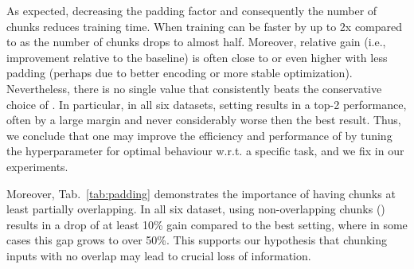 As expected, decreasing the padding factor and consequently the number of chunks reduces training time. When  training can be faster by up to 2x compared to  as the number of chunks drops to almost half. 
Moreover, relative gain (i.e., improvement relative to the baseline) is often close to or even higher with less padding (perhaps due to better encoding or more stable optimization). Nevertheless, there is no single  value that consistently beats the conservative choice of . In particular, in all six datasets, setting  results in a top-2 performance, often by a large margin and never considerably worse then the best result.
Thus, we conclude that one may improve the efficiency and performance of \sled{} by tuning the hyperparameter  for optimal behaviour w.r.t. a specific task, and we fix  in our experiments.

Moreover, Tab.~\ref{tab:padding} demonstrates the importance of having chunks at least partially overlapping. In all six dataset, using non-overlapping chunks () results in a drop of at least 10\% gain compared to the best setting, where in some cases this gap grows to over 50\%. This supports our hypothesis that chunking inputs with no overlap may lead to crucial loss of information.

\begin{table}[th]
\footnotesize
\addtolength{\tabcolsep}{-3pt}
\centering
{}
\caption{\bartbase{}-\sled{} relative improvement compared to \bartbase{} when varying the padding percentage ().
In all cases the maximum input length is 16K and . Relative gain is measured w.r.t. Rouge-2 for GovReport, SummScreenFD and QMSum, F for Qasper and NarrativeQA and exact match for ContractNLI. In each column, \textbf{boldface} marks the top performing value and \underline{underline} the second-best.}
\label{tab:padding}
\end{table}

 
